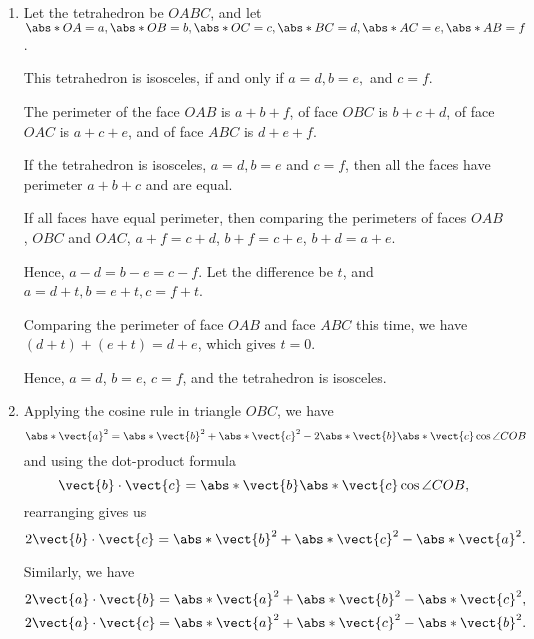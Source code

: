 \Question{\currfilebase}

\begin{enumerate}
    \item Let the tetrahedron be \(OABC\), and let \(\abs*{OA} = a, \abs*{OB} = b, \abs*{OC} = c, \abs*{BC} = d, \abs*{AC} = e, \abs*{AB} = f\).

          This tetrahedron is isosceles, if and only if \(a = d, b = e,\) and \(c = f\).

          The perimeter of the face \(OAB\) is \(a + b + f\), of face \(OBC\) is \(b + c + d\), of face \(OAC\) is \(a + c + e\), and of face \(ABC\) is \(d + e + f\).

          If the tetrahedron is isosceles, \(a = d, b = e\) and \(c = f\), then all the faces have perimeter \(a + b + c\) and are equal.

          If all faces have equal perimeter, then comparing the perimeters of faces \(OAB\), \(OBC\) and \(OAC\), \(a + f = c + d\), \(b + f = c + e\), \(b + d = a + e\).

          Hence, \(a - d = b - e = c - f\). Let the difference be \(t\), and \(a = d + t, b = e + t, c = f + t\).

          Comparing the perimeter of face \(OAB\) and face \(ABC\) this time, we have \((d + t) + (e + t) = d + e\), which gives \(t = 0\).

          Hence, \(a = d\), \(b = e\), \(c = f\), and the tetrahedron is isosceles.

    \item Applying the cosine rule in triangle \(OBC\), we have
          \[
              \abs*{\vect{a}}^2 = \abs*{\vect{b}}^2 + \abs*{\vect{c}}^2 - 2 \abs*{\vect{b}} \abs*{\vect{c}} \cos \angle COB
          \]
          and using the dot-product formula
          \[
              \vect{b} \cdot \vect{c} = \abs*{\vect{b}} \abs*{\vect{c}} \cos \angle COB,
          \]
          rearranging gives us
          \[
              2 \vect{b} \cdot \vect{c} = \abs*{\vect{b}}^2 + \abs*{\vect{c}}^2 - \abs*{\vect{a}}^2.
          \]

          Similarly, we have
          \begin{align*}
              2 \vect{a} \cdot \vect{b} & = \abs*{\vect{a}}^2 + \abs*{\vect{b}}^2 - \abs*{\vect{c}}^2, \\
              2 \vect{a} \cdot \vect{c} & = \abs*{\vect{a}}^2 + \abs*{\vect{c}}^2 - \abs*{\vect{b}}^2.
          \end{align*}


\end{enumerate}
